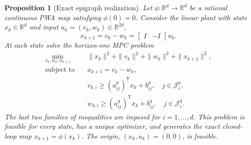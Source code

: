 \documentclass{IEEEtran}
\newtheorem{proposition}[theorem]{Proposition}
\theoremstyle{remark}
\newcommand{\R}{\mathbb{R}}
\begin{document}
\begin{proposition}[Exact epigraph realization]
\label{prop:fixed-dimensional-realization}
Let $\phi:\R^d\to\R^d$ be a rational continuous PWA map satisfying
$\phi(0)=0$.  Consider the linear plant with state $x_k\in\R^d$ and input
$u_k=(v_k,w_k)\in\R^{2d}$,
\begin{equation}
  x_{k+1}=v_k-w_k
  =\begin{bmatrix}I&-I\end{bmatrix}u_k.
  \label{eq:fixed-dimensional-plant}
\end{equation}
At each state solve the horizon-one MPC problem
\begin{subequations}
\label{eq:fixed-dimensional-mpc}
\begin{align}
 \min_{v_k,w_k,x_{k+1}}\quad&
  \|x_k\|^2+\|v_k\|^2+\|w_k\|^2+\|x_{k+1}\|^2,\\
 \text{subject to}\quad&
  x_{k+1}=v_k-w_k,\\
 &v_{k,i}\ge (a_{ij}^p)^{\mathsf T}x_k+b_{ij}^p,
   \quad j\in\mathcal J_i^p,\\
 &w_{k,i}\ge (a_{ij}^q)^{\mathsf T}x_k+b_{ij}^q,
   \quad j\in\mathcal J_i^q.
\end{align}
\end{subequations}
The last two families of inequalities are imposed for $i=1,\ldots,d$.
This problem is feasible for every state, has a unique optimizer, and generates
the exact closed-loop map $x_{k+1}=\phi(x_k)$.  The origin,
$(x_k,u_k)=(0,0)$, is feasible.
\end{proposition}
\end{document}
